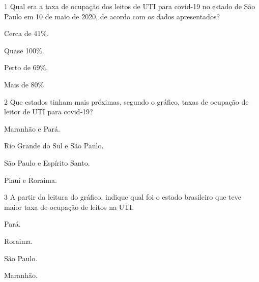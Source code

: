 \num{1} Qual era a taxa de ocupação dos leitos de UTI para covid-19 no estado de São
Paulo em 10 de maio de 2020, de acordo com os dados apresentados?

\begin{minipage}{.5\textwidth}
\begin{escolha}
\item Cerca de 41\%.

\item Quase 100\%.

\item Perto de 69\%.

\item Mais de 80\%
\end{escolha}
\end{minipage}


\num{2} Que estados tinham mais próximas, segundo o gráfico, taxas de ocupação de leitor de UTI para covid-19?

\begin{minipage}{.5\textwidth}
\begin{escolha}
\item Maranhão e Pará.

\item Rio Grande do Sul e São Paulo.

\item São Paulo e Espírito Santo.

\item Piauí e Roraima.
\end{escolha}
\end{minipage}

\pagebreak
\num{3} A partir da leitura do gráfico, indique qual foi o estado brasileiro que teve
maior taxa de ocupação de leitos na UTI.

\begin{minipage}{.5\textwidth}
\begin{escolha}
\item Pará.

\item Roraima.

\item São Paulo.

\item Maranhão.
\end{escolha}
\end{minipage}

